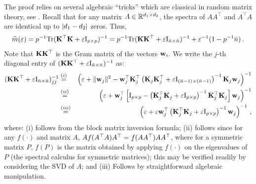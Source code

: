 \documentclass[times,sort&compress,3p]{elsarticle}
\begin{document}
The proof relies on several algebraic ``tricks'' which are classical in random matrix theory, see \cite{bai2010spectral}.
Recall that for any matrix $A\in \mathbb{R}^{d_1\times d_2}$, the spectra of $AA^\top$ and $A^\top A$ are identical up to  $\left \vert d_1-d_2 \right \vert$ zeros. 
Thus,
\begin{equation}\label{eq:main-technical-helper2-1}
    \widehat{m}(\varepsilon)=p^{-1}\textrm{Tr}({\bf K}^\top{\bf K}  +\varepsilon\mathrm{I}_{p \times p} )^{-1} = p^{-1} \textrm{Tr}({\bf K}{\bf K}^\top  +\varepsilon\mathrm{I}_{\bar{n} \times \bar{n}} )^{-1} + \varepsilon^{-1} (1-p^{-1}\bar{n}) \,.
\end{equation}
Note that ${\bf K}{\bf K}^\top$ is the Gram matrix of the vectors ${\bf w}_i$. We write the $j$-th diagonal entry of $({\bf K}{\bf K}^\top  +\varepsilon\mathrm{I}_{\bar{n} \times \bar{n}} )^{-1}$ as:
\begin{eqnarray}
    ({\bf K}{\bf K}^\top  +\varepsilon\mathrm{I}_{\bar{n} \times \bar{n}} )^{-1}_{jj} 
        &\overset{(i)}{=}& \left( \varepsilon + \|{\bf w}_j\|^2 - {\bf w}_j^\top {\bf K}_j^\top \left({\bf K}_j{\bf K}_j^\top + \varepsilon\mathrm{I}_{(\bar{n}-1) \times (\bar{n}-1)} \right)^{-1}{\bf K}_j{\bf w}_j \right)^{-1} \nonumber\\
        &\overset{(ii)}{=}& \left( \varepsilon + {\bf w}_j^\top \left[ \mathrm{I}_{p \times p} - \left({\bf K}_j^\top {\bf K}_j + \varepsilon\mathrm{I}_{p \times p} \right)^{-1}{\bf K}_j^\top {\bf K}_j \right]{\bf w}_j \right)^{-1}  \nonumber \\
        &\overset{(iii)}{=}& \left( \varepsilon + \varepsilon {\bf w}_j^\top \left({\bf K}_j^\top {\bf K}_j + \varepsilon\mathrm{I}_{p \times p} \right)^{-1}{\bf w}_j \right)^{-1} \,,
    \label{eq:main-technical-helper2-2}
\end{eqnarray}
where: (i) follows from the block matrix inversion formula; (ii) follows since for any $f(\cdot)$ and matrix $A$, $A f(A^\top A) A^\top = f(AA^\top)AA^\top$, where for a symmetric matrix $P$, $f(P)$ is the matrix obtained by applying $f(\cdot)$ on the eigenvalues of $P$ (the spectral calculus for symmetric matrices); this may be verified readily by considering the SVD of $A$; and (iii) Follows by straightforward algebraic manipulation.  
\end{document}
